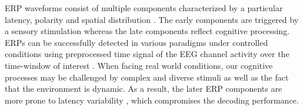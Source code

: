 \documentclass[12pt]{iopart}
\begin{document}




ERP waveforms consist of multiple components characterized
by a particular latency, polarity and spatial distribution \cite{duncan_event-related_2009}.
The early components are triggered by a sensory stimulation
whereas the late components reflect cognitive processing.
ERPs can be successfully detected in various paradigms under controlled conditions
using preprocessed time signal of the EEG channel activity over the time-window of interest \cite{blankertz_single-trial_2011}.
When facing real world conditions, our cognitive processes may be challenged
by complex and diverse stimuli 
as well as the fact that the environment is dynamic.
As a result, the later ERP components are more prone to latency variability \cite{arico_evaluation_2013},
which compromises the decoding performance.

\end{document}
